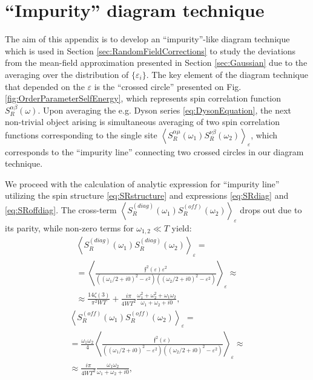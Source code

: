 \documentclass[twocolumn,english,prb]{revtex4-1}
\begin{document}
\section{``Impurity'' diagram technique}
\label{sec:ImpurityTechnique}
The aim of this appendix is to develop an ``impurity''-like diagram technique which is used in Section \ref{sec:RandomFieldCorrections} to study the deviations from the mean-field approximation presented in Section \ref{sec:Gaussian} due to the averaging over the distribution of $\{\varepsilon_i\}$. The key element of the diagram technique that depended on the $\varepsilon$ is the ``crossed circle'' presented on Fig. \ref{fig:OrderParameterSelfEnergy}, which represents spin correlation function $S_R^{\alpha \beta}(\omega)$. Upon averaging the e.g. Dyson series \eqref{eq:DysonEquation}, the next non-trivial object arising is simultaneous averaging of two spin correlation functions corresponding to the single site $\left\langle S^{\alpha \mu}_{R}(\omega_1) S_{R}^{\nu \beta}(\omega_2)\right\rangle_\varepsilon$, which corresponds to the ``impurity line'' connecting two crossed circles in our diagram technique.

We proceed with the calculation of analytic expression for ``impurity line'' utilizing the spin structure \eqref{eq:SRstructure} and expressions \eqref{eq:SRdiag} and \eqref{eq:SRoffdiag}. The cross-term $\left\langle S_{R}^{(diag)}(\omega_{1})S_{R}^{(off)}(\omega_{2})\right \rangle_\varepsilon$  drops out due to its parity, while non-zero terms for $\omega_{1,2} \ll T$ yield:
\begin{multline}
\left\langle S_{R}^{(diag)}(\omega_{1})S_{R}^{(diag)}(\omega_{2})\right\rangle_\varepsilon =\\
=\left\langle\frac{\mathfrak{f}^{2}(\varepsilon)\varepsilon^{2}}{((\omega_{1}/2+i0)^{2}-\varepsilon^{2})((\omega_{2}/2+i0)^{2}-\varepsilon^{2})}\right\rangle_{\varepsilon} \approx \\	
\approx \frac{14 \zeta(3)}{\pi^2 WT} + \frac{i\pi}{4 WT^{2}}\frac{\omega_{1}^{2}+\omega_{2}^{2}+\omega_{1}\omega_{2}}{\omega_{1}+\omega_{2}+i0},
\end{multline}
\begin{multline}
\left\langle S_{R}^{(off)}(\omega_{1})S_{R}^{(off)}(\omega_{2})\right\rangle_\varepsilon = \\
= \frac{\omega_{1}\omega_{2}}{4}\left\langle \frac{\mathfrak{f}^{2}(\varepsilon)}{((\omega_{1}/2+i0)^{2}-\varepsilon^{2})((\omega_{2}/2+i0)^{2}-\varepsilon^{2})}\right\rangle_{\varepsilon} \approx  \\
\approx \frac{i\pi}{4WT^{2}}\frac{\omega_{1}\omega_{2}}{\omega_{1}+\omega_{2}+i0},
\end{multline}
\end{document}
